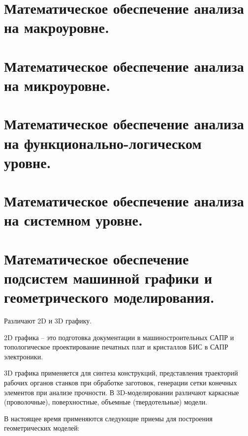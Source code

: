 \documentclass[unicode, 12pt, a4paper, oneside]{article}
\begin{document}
\section{Математическое обеспечение анализа на макроуровне.}



\section{Математическое обеспечение анализа на микроуровне.}

\section{Математическое обеспечение анализа на функционально-логическом уровне.}

\section{Математическое обеспечение анализа на системном уровне.}

\section{Математическое обеспечение подсистем машинной графики и геометрического моделирования.}

Различают 2D и 3D графику.

2D  графика – это подготовка документации в машиностроительных САПР и топологическое проектирование печатных плат и кристаллов БИС в САПР электроники.

3D графика применяется для синтеза конструкций, представления траекторий рабочих органов станков при обработке заготовок, генерации сетки конечных элементов при анализе прочности. В 3D-моделировании различают каркасные (проволочные), поверхностные, объемные (твердотельные) модели.

В настоящее время применяются следующие приемы для построения геометрических моделей:
\end{document}
